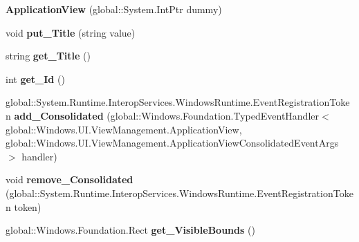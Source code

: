 \begin{DoxyCompactItemize}
{\bfseries Application\+View} (global\+::\+System.\+Int\+Ptr dummy)
\item 
\mbox{\label{class_windows_1_1_u_i_1_1_view_management_1_1_application_view_ac9a73477b84f2c3e9e09660fdfe04e89}} 
void {\bfseries put\+\_\+\+Title} (string value)
\item 
\mbox{\label{class_windows_1_1_u_i_1_1_view_management_1_1_application_view_a08cf5cd5b2e28afa51bc13468334352a}} 
string {\bfseries get\+\_\+\+Title} ()
\item 
\mbox{\label{class_windows_1_1_u_i_1_1_view_management_1_1_application_view_a4327352f99894f72219cfb4cad222952}} 
int {\bfseries get\+\_\+\+Id} ()
\item 
\mbox{\label{class_windows_1_1_u_i_1_1_view_management_1_1_application_view_a0ffeec110a4a66c247c6e2a9b4be797b}} 
global\+::\+System.\+Runtime.\+Interop\+Services.\+Windows\+Runtime.\+Event\+Registration\+Token {\bfseries add\+\_\+\+Consolidated} (global\+::\+Windows.\+Foundation.\+Typed\+Event\+Handler$<$ global\+::\+Windows.\+U\+I.\+View\+Management.\+Application\+View, global\+::\+Windows.\+U\+I.\+View\+Management.\+Application\+View\+Consolidated\+Event\+Args $>$ handler)
\item 
\mbox{\label{class_windows_1_1_u_i_1_1_view_management_1_1_application_view_a1c5d2a3b58064582c6456f48994b44d6}} 
void {\bfseries remove\+\_\+\+Consolidated} (global\+::\+System.\+Runtime.\+Interop\+Services.\+Windows\+Runtime.\+Event\+Registration\+Token token)
\item 
\mbox{\label{class_windows_1_1_u_i_1_1_view_management_1_1_application_view_aee267cf0554bac921b2c6c10392310b7}} 
global\+::\+Windows.\+Foundation.\+Rect {\bfseries get\+\_\+\+Visible\+Bounds} ()
\item 
\mbox{\label{class_windows_1_1_u_i_1_1_view_management_1_1_application_view_a1a4e9c3942d4eb2602fdeb123ed6f77a}} 

\end{DoxyCompactItemize}
